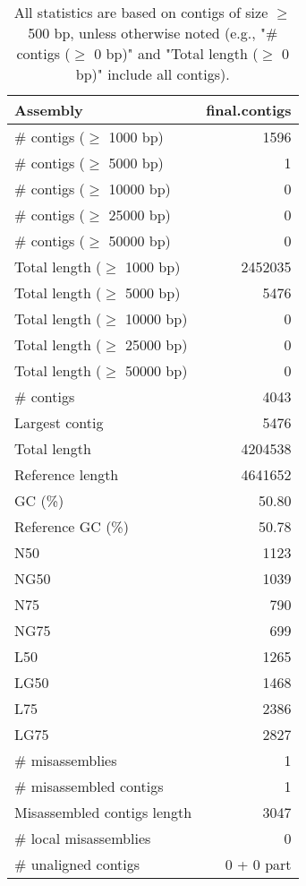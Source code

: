 \documentclass[12pt,a4paper]{article}
\begin{document}
\begin{table}[ht]
\begin{center}
\caption{All statistics are based on contigs of size $\geq$ 500 bp, unless otherwise noted (e.g., "\# contigs ($\geq$ 0 bp)" and "Total length ($\geq$ 0 bp)" include all contigs).}
\begin{tabular}{|l*{1}{|r}|}
\hline
Assembly & final.contigs \\ \hline
\# contigs ($\geq$ 1000 bp) & 1596 \\ \hline
\# contigs ($\geq$ 5000 bp) & 1 \\ \hline
\# contigs ($\geq$ 10000 bp) & 0 \\ \hline
\# contigs ($\geq$ 25000 bp) & 0 \\ \hline
\# contigs ($\geq$ 50000 bp) & 0 \\ \hline
Total length ($\geq$ 1000 bp) & 2452035 \\ \hline
Total length ($\geq$ 5000 bp) & 5476 \\ \hline
Total length ($\geq$ 10000 bp) & 0 \\ \hline
Total length ($\geq$ 25000 bp) & 0 \\ \hline
Total length ($\geq$ 50000 bp) & 0 \\ \hline
\# contigs & 4043 \\ \hline
Largest contig & 5476 \\ \hline
Total length & 4204538 \\ \hline
Reference length & 4641652 \\ \hline
GC (\%) & 50.80 \\ \hline
Reference GC (\%) & 50.78 \\ \hline
N50 & 1123 \\ \hline
NG50 & 1039 \\ \hline
N75 & 790 \\ \hline
NG75 & 699 \\ \hline
L50 & 1265 \\ \hline
LG50 & 1468 \\ \hline
L75 & 2386 \\ \hline
LG75 & 2827 \\ \hline
\# misassemblies & 1 \\ \hline
\# misassembled contigs & 1 \\ \hline
Misassembled contigs length & 3047 \\ \hline
\# local misassemblies & 0 \\ \hline
\# unaligned contigs & 0 + 0 part \\ \hline

\end{tabular}
\end{center}
\end{table}
\end{document}
